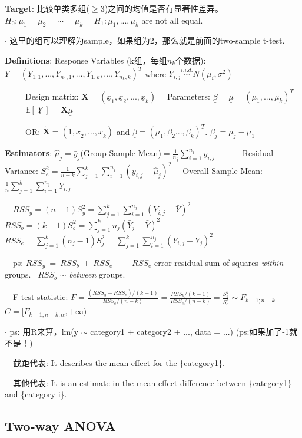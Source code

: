\documentclass[9pt]{article}
\begin{document}
    \textbf{Target}: 比较单类多组($\geq$3)之间的均值是否有显著性差异。 \ \ \ \ \ $H_0:\mu_1=\mu_2=\cdots=\mu_k$ \ \ $H_1:\mu_1,...,\mu_k$ are not all equal.

$\cdot$ 这里的组可以理解为sample，如果组为2，那么就是前面的two-sample t-test.

    \textbf{Definitions}: Response Variables {\small(k组，每组$n_k$个数据)}: $\underline{Y}=(Y_{1,1},...,Y_{n_1,1},...,Y_{1,k},...,Y_{n_k,k})^T$ where $Y_{i,j}\stackrel{i.i.d.}{\sim}N(\mu_i,\sigma^2)$

    \ \ \ \ \ Design matrix: $\mathbf{X}=( \underline{x}_1,\underline{x}_2,...,\underline{x}_k )$ \ \ Parameters: $\underline{\beta}=\underline{\mu}=(\mu_1,...,\mu_k)^T$ \ \ \ \ \ $\mathbb{E}[ \ \underline{Y} \ ]=\mathbf{X}\underline{\mu}$

    \ \ \ \ \ OR: $\tilde{\mathbf{X}}=(\underline{1},\underline{x}_2,...,\underline{x}_k)$ and $\underline{\beta}=(\mu_1,\beta_2...,\beta_k)^T$. $\beta_j=\mu_j-\mu_1$

    \textbf{Estimators}: {\footnotesize $\hat{\mu}_j=\bar{y}_j$(Group Sample Mean)$=\frac{1}{n_j}\sum_{i=1}^{n_j}y_{i,j}$ \ \ \ \ \ \ Residual Variance: $S_e^2=\frac{1}{n-k}\sum_{j=1}^{k}\sum_{i=1}^{n_j}(y_{i,j}-\hat{\mu}_j)^2$ \ \ Overall Sample Mean: $\frac{1}{n}\sum_{j=1}^{k}\sum_{i=1}^{n_j}Y_{i,j}$}

    \ \ $RSS_y=(n-1)S^2_y=\sum_{j=1}^{k}\sum_{i=1}^{n_j}(Y_{i,j}-\bar{Y})^2$ \ \ $RSS_b=(k-1)S^2_b=\sum_{j=1}^{k}n_j(\bar{Y}_j-\bar{Y})^2$ \ \ $RSS_e=\sum_{j=1}^{k}(n_j-1)S^2_j=\sum_{j=1}^{k}\sum_{i=1}^{n_j}(Y_{i,j}-\bar{Y}_j)^2$

    \ \ ps: $RSS_y \ = \ RSS_b \ + \ RSS_e$ \ \ \ \ $RSS_e$ error residual sum of squares \textit{within} groups. \ $RSS_b$ $\sim$ \textit{between} groups.

    \ \ F-test statistic: $F=\frac{(RSS_y-RSS_e)/(k-1)}{RSS_e/(n-k)}=\frac{RSS_b/(k-1)}{RSS_e/(n-k)}=\frac{S^2_b}{S^2_e}\sim F_{k-1;n-k}$ \ \ \ \ \ $C=[F_{k-1,n-k;\alpha},+\infty)$

$\cdot$ ps: 用R来算，lm(y $\sim$ category1 + category2 + ..., data = ...) (ps:如果加了-1就不是！)

    \ \ 截距代表: It describes the mean effect for the \{category1\}.

    \ \ 其他代表: It is an estimate in the mean effect difference between \{category1\} and \{category i\}.

    \subsection{Two-way ANOVA}
\end{document}
